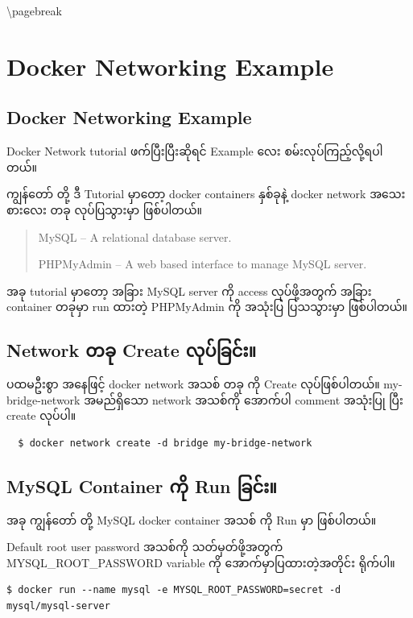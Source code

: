 \textbackslash{}pagebreak

\section{Docker Networking Example}\label{docker-networking-example}

\subsection{Docker Networking
Example}\label{docker-networking-example-1}

Docker Network tutorial ဖက်ပြီးပြီးဆိုရင် Example လေး
စမ်းလုပ်ကြည့်လို့ရပါတယ်။

ကျွန်တော် တို့ ဒီ Tutorial မှာတော့ docker containers နှစ်ခုနဲ့ docker
network အသေးစားလေး တခု လုပ်ပြသွားမှာ ဖြစ်ပါတယ်။

\begin{quote}
MySQL -- A relational database server.

PHPMyAdmin -- A web based interface to manage MySQL server.
\end{quote}

အခု tutorial မှာတော့ အခြား MySQL server ကို access လုပ်ဖို့အတွက် အခြား
container တခုမှာ run ထားတဲ့ PHPMyAdmin ကို အသုံးပြ ပြသသွားမှာ ဖြစ်ပါတယ်။

\subsection{Network တခု Create လုပ်ခြင်း။}\label{network--create-}

ပထမဦးစွာ အနေဖြင့် docker network အသစ် တခု ကို Create လုပ်ဖြစ်ပါတယ်။
my-bridge-network အမည်ရှိသော network အသစ်ကို အောက်ပါ comment အသုံးပြု
ပြီး create လုပ်ပါ။

\begin{verbatim}
  $ docker network create -d bridge my-bridge-network
\end{verbatim}

\subsection{MySQL Container ကို Run ခြင်း။}\label{mysql-container--run-}

အခု ကျွန်တော် တို့ MySQL docker container အသစ် ကို Run မှာ ဖြစ်ပါတယ်။

Default root user password အသစ်ကို သတ်မှတ်ဖို့အတွက်
MYSQL\_ROOT\_PASSWORD variable ကို အောက်မှာပြထားတဲ့အတိုင်း ရိုက်ပါ။

\begin{verbatim}
$ docker run --name mysql -e MYSQL_ROOT_PASSWORD=secret -d mysql/mysql-server
\end{verbatim}

